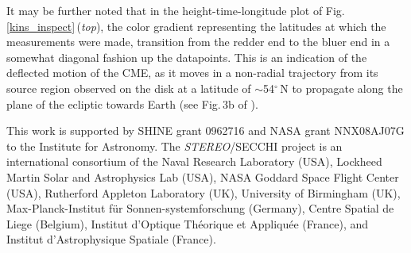 \documentclass[preprint2]{aastex}
\begin{document}
It may be further noted that in the height-time-longitude plot of Fig.\,\ref{kins_inspect}\,(\emph{top}), the color gradient representing the latitudes at which the measurements were made, transition from the redder end to the bluer end in a somewhat diagonal fashion up the datapoints. This is an indication of the deflected motion of the CME, as it moves in a non-radial trajectory from its source region observed on the disk at a latitude of $\sim$54$^{\circ}$\,N to propagate along the plane of the ecliptic towards Earth (see Fig.\,3b of \citealt{2010NatCo...1E..74B}).


\acknowledgments

This work is supported by SHINE grant 0962716 and NASA grant NNX08AJ07G to the Institute for Astronomy. %
The \emph{STEREO}/SECCHI project is an international consortium of the Naval Research Laboratory (USA), Lockheed Martin Solar and Astrophysics Lab (USA), NASA Goddard Space Flight Center (USA), Rutherford Appleton Laboratory (UK), University of Birmingham (UK), Max-Planck-Institut f\"{u}r Sonnen-systemforschung (Germany), Centre Spatial de Liege (Belgium), Institut d'Optique Th\'{e}orique et Appliqu\'{e}e (France), and Institut d'Astrophysique Spatiale (France).




  
\end{document}
